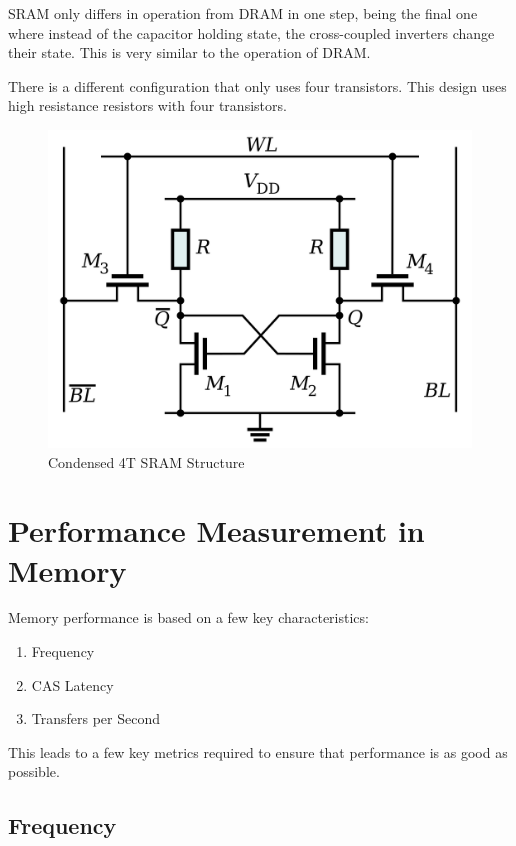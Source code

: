SRAM only differs in operation from DRAM in one step, being the final one where instead of the capacitor holding state, the cross-coupled inverters change their state. This is very similar to the operation of DRAM.

There is a different configuration that only uses four transistors. This design uses high resistance resistors with four transistors.

\begin{figure}
  \centering
  \includegraphics[scale=0.15]{assets/4tsram.png}
  \caption{Condensed 4T SRAM Structure}
  \label{fig:sram4t}
\end{figure}

\chapter{Performance Measurement in Memory}

Memory performance is based on a few key characteristics:
\begin{enumerate}
  \item Frequency
  \item CAS Latency
  \item Transfers per Second
\end{enumerate}

This leads to a few key metrics required to ensure that performance is as good as possible.

\section{Frequency}

